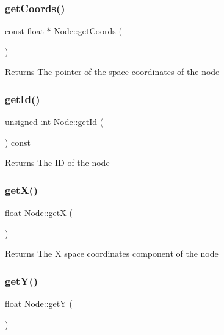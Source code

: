 \subsubsection{\texorpdfstring{get\+Coords()}{getCoords()}}
{\footnotesize\ttfamily const float $\ast$ Node\+::get\+Coords (\begin{DoxyParamCaption}{ }\end{DoxyParamCaption})}

\begin{DoxyReturn}{Returns}
The pointer of the space coordinates of the node 
\end{DoxyReturn}
\mbox{\label{classNode_af9b4c1c72ce14b69f5e99deb4440f489}} 
\subsubsection{\texorpdfstring{get\+Id()}{getId()}}
{\footnotesize\ttfamily unsigned int Node\+::get\+Id (\begin{DoxyParamCaption}{ }\end{DoxyParamCaption}) const}

\begin{DoxyReturn}{Returns}
The ID of the node 
\end{DoxyReturn}
\mbox{\label{classNode_a98ba03ab2272a479d3173932a40c3a41}} 
\subsubsection{\texorpdfstring{get\+X()}{getX()}}
{\footnotesize\ttfamily float Node\+::getX (\begin{DoxyParamCaption}{ }\end{DoxyParamCaption})}

\begin{DoxyReturn}{Returns}
The X space coordinates component of the node 
\end{DoxyReturn}
\mbox{\label{classNode_a55366d94e5244071158b45b31c43dd8b}} 
\subsubsection{\texorpdfstring{get\+Y()}{getY()}}
{\footnotesize\ttfamily float Node\+::getY (\begin{DoxyParamCaption}{ }\end{DoxyParamCaption})}

